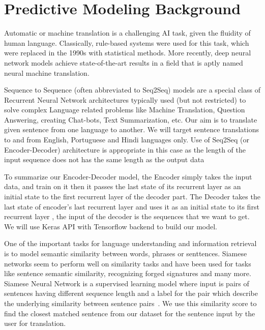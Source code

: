 \documentclass[runningheads]{llncs}
\begin{document}
	\section{Predictive Modeling Background}
	Automatic or machine translation is a challenging AI task, given the fluidity of human language. Classically, rule-based systems were used for this task, which were replaced in the 1990s with statistical methods. More recently, deep neural network models achieve state-of-the-art results in a field that is aptly named neural machine translation. ~\cite{ref_url16}
	
	Sequence to Sequence (often abbreviated to Seq2Seq) models are a special class of Recurrent Neural Network architectures typically used (but not restricted) to solve complex Language related problems like Machine Translation, Question Answering, creating Chat-bots, Text Summarization, etc. Our aim is to translate given sentence from one language to another. We will target sentence translations to and from English, Portuguese and  Hindi languages only. Use of Seq2Seq (or Encoder-Decoder) architecture is appropriate in this case as the length of the input sequence  does not has the same length as the output data
	
	To summarize our Encoder-Decoder model, the Encoder simply takes the input data, and train on it then it passes the last state of its recurrent layer as an initial state to the first recurrent layer of the decoder part. The Decoder takes the last state of encoder’s last recurrent layer and uses it as an initial state to its first recurrent layer , the input of the decoder is the sequences that we want to get. We will use Keras API with Tensorflow backend to build our model.
	
	One of the important tasks for language understanding and information retrieval is to model semantic similarity between words, phrases or senttences. Siamese networks seem to perform well on similarity tasks and have been used for tasks like sentence semantic similarity, recognizing forged signatures and many more.
	Siamese Neural Network is a supervised learning model where input is pairs of sentences having different sequence length and a label for the pair which describe the underlying similarity between sentence pairs~\cite{ref_url21}. We use this similarity score to find the closest matched sentence from our dataset for the sentence input by the user for translation.
	
	
\end{document}
